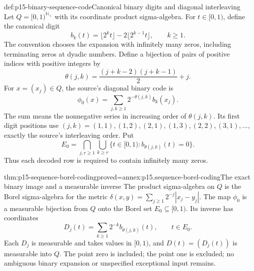 \begin{hbdefinition}{def:p15-binary-sequence-code}{Canonical binary digits and diagonal interleaving}
Let \(Q=[0,1)^{\mathbb N_+}\) with its coordinate product
sigma-algebra. For \(t\in[0,1)\), define the canonical digit
\[
 b_k(t)=\lfloor2^kt\rfloor-2\lfloor2^{k-1}t\rfloor,
                         \qquad k\geq1.
\]
The convention chooses the expansion with infinitely many zeros,
including terminating zeros at dyadic numbers. Define a bijection of
pairs of positive indices with positive integers by
\[
 \theta(j,k)=\frac{(j+k-2)(j+k-1)}2+j.
\]
For \(x=(x_j)\in Q\), the source's diagonal binary code is
\[
 \phi_0(x)=\sum_{j,k\geq1}2^{-\theta(j,k)}b_k(x_j).
\]
The sum means the nonnegative series in increasing order of
\(\theta(j,k)\). Its first digit positions use
\((j,k)=(1,1),(1,2),(2,1),(1,3),(2,2),(3,1),\ldots\),
exactly the source's interleaving order. Put
\[
 E_0=\bigcap_{j,r\geq1}\bigcup_{k\geq r}
           \{t\in[0,1):b_{\theta(j,k)}(t)=0\}.
\]
Thus each decoded row is required to contain infinitely many zeros.
\end{hbdefinition}

\begin{hbtheorem}{thm:p15-sequence-borel-coding}{proved=annex:p15.sequence-borel-coding}{The exact binary image and a measurable inverse}
The product sigma-algebra on \(Q\) is the Borel sigma-algebra for
the metric
\(\delta(x,y)=\sum_{j\geq1}2^{-j}|x_j-y_j|\).
The map \(\phi_0\) is a measurable bijection from \(Q\) onto
the Borel set \(E_0\subseteq[0,1)\). Its inverse has coordinates
\[
 D_j(t)=\sum_{k\geq1}2^{-k}b_{\theta(j,k)}(t),
                  \qquad t\in E_0.
\]
Each \(D_j\) is measurable and takes values in \([0,1)\), and
\(D(t)=(D_j(t))\) is measurable into \(Q\). The point zero is
included; the point one is excluded; no ambiguous binary expansion
or unspecified exceptional input remains.
\end{hbtheorem}

